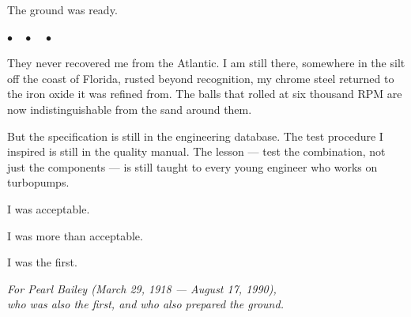 \documentclass[12pt, letterpaper]{article}
\begin{document}
The ground was ready.

\begin{center}
$\bullet\quad\bullet\quad\bullet$
\end{center}

They never recovered me from the Atlantic. I am still there, somewhere in the silt off the coast of Florida, rusted beyond recognition, my chrome steel returned to the iron oxide it was refined from. The balls that rolled at six thousand RPM are now indistinguishable from the sand around them.

But the specification is still in the engineering database. The test procedure I inspired is still in the quality manual. The lesson --- test the combination, not just the components --- is still taught to every young engineer who works on turbopumps.

I was acceptable.

I was more than acceptable.

I was the first.

\vspace{2em}
\begin{center}
\textit{For Pearl Bailey (March 29, 1918 --- August 17, 1990),\\who was also the first, and who also prepared the ground.}
\end{center}
\end{document}
